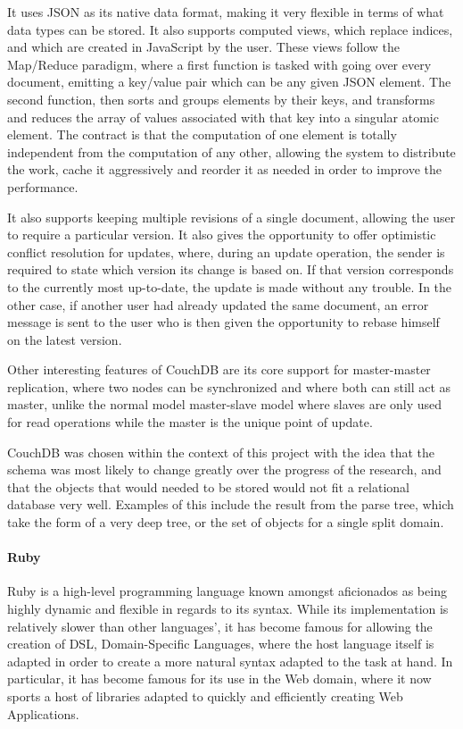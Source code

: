 It uses JSON as its native data format, making it very flexible in terms of what data types can be stored. It also supports computed views, which replace indices, and which are created in JavaScript by the user. These views follow the Map/Reduce paradigm, where a first function is tasked with going over every document, emitting a key/value pair which can be any given JSON element. The second function, then sorts and groups elements by their keys, and transforms and reduces the array of values associated with that key into a singular atomic element. The contract is that the computation of one element is totally independent from the computation of any other, allowing the system to distribute the work, cache it aggressively and reorder it as needed in order to improve the performance.

It also supports keeping multiple revisions of a single document, allowing the user to require a particular version. It also gives the opportunity to offer optimistic conflict resolution for updates, where, during an update operation, the sender is required to state which version its change is based on. If that version corresponds to the currently most up-to-date, the update is made without any trouble. In the other case, if another user had already updated the same document, an error message is sent to the user who is then given the opportunity to rebase himself on the latest version.

Other interesting features of CouchDB are its core support for master-master replication, where two nodes can be synchronized and where both can still act as master, unlike the normal model master-slave model where slaves are only used for read operations while the master is the unique point of update.

CouchDB was chosen within the context of this project with the idea that the schema was most likely to change greatly over the progress of the research, and that the objects that would needed to be stored would not fit a relational database very well. Examples of this include the result from the parse tree, which take the form of a very deep tree, or the set of objects for a single split domain.


\paragraph{Ruby} %
\label{par:ruby}

Ruby is a high-level programming language known amongst aficionados as being highly dynamic and flexible in regards to its syntax. While its implementation is relatively slower than other languages', it has become famous for allowing the creation of DSL, Domain-Specific Languages, where the host language itself is adapted in order to create a more natural syntax adapted to the task at hand. In particular, it has become famous for its use in the Web domain, where it now sports a host of libraries adapted to quickly and efficiently creating Web Applications.

